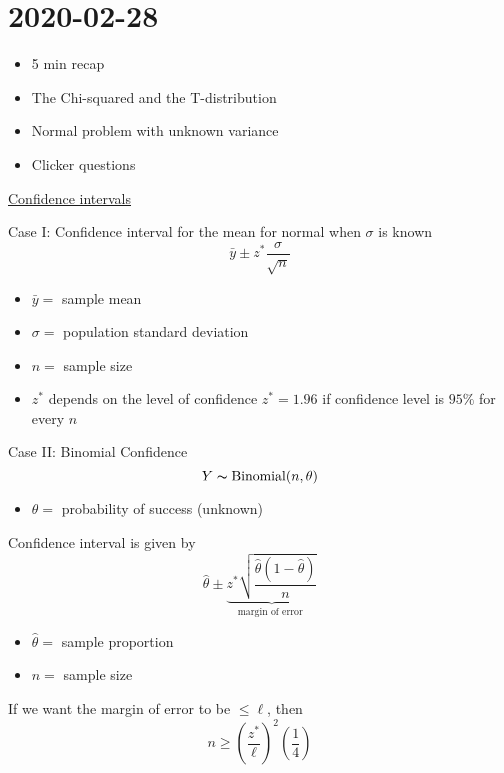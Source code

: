 \section{2020-02-28}
\begin{itemize}
    \item 5 min recap
    \item The Chi-squared and the T-distribution
    \item Normal problem with unknown variance
    \item Clicker questions
\end{itemize}
\underline{Confidence intervals}

Case I: Confidence interval for the mean for normal when $ \sigma $ is known
\[ \bar{y}\pm z^* \frac{\sigma}{\sqrt{n}}  \]
\begin{itemize}
    \item $ \bar{y}= $ sample mean
    \item $ \sigma= $ population standard deviation
    \item $ n= $ sample size
    \item $ z^* $ depends on the level of confidence
          \subitem $ z^*=1.96 $ if confidence level is $ 95\% $ for every $ n $
\end{itemize}

Case II: Binomial Confidence
\[ Y \thicksim \operatorname{Binomial}(n,\theta) \]
\begin{itemize}
    \item $ \theta= $ probability of success (unknown)
\end{itemize}
Confidence interval is given by
\[ \hat{\theta}\pm \underbrace{z^* \sqrt{\frac{\hat{\theta}\left( 1-\hat{\theta} \right)}{n}}}_{\text{
            margin of error
        }} \]
\begin{itemize}
    \item $ \hat{\theta}= $ sample proportion
    \item $ n= $ sample size
\end{itemize}
If we want the margin of error to be $ \leqslant \ell $, then
\[ n\geqslant \left( \frac{z^*}{\ell} \right)^2\left( \frac{1}{4} \right) \]

